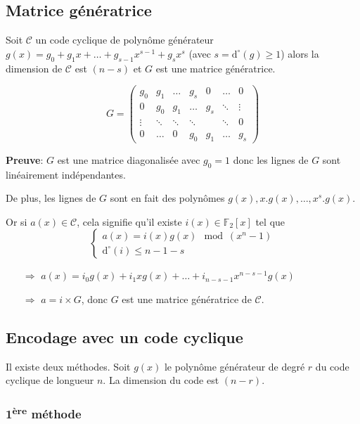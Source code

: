 \documentclass[a4paper,10pt,twocolumn]{article}
\theoremstyle{break}
\newcommand{\code}[1]{\mathcal{#1}}
\newcommand{\C}{\code{C}}
\newcommand{\F}{\mathbb{F}}
\newcommand{\FF}{\F_2}
\newcommand{\dg}[1]{\mathrm{d}^\circ(#1)}
\newenvironment{note}[1]
{\textbf{#1}:}
{}
\newenvironment{myproof}
{\begin{note}{Preuve}}
{\end{note}}
\begin{document}
\subsection{Matrice génératrice}
Soit $\C$ un code cyclique de polynôme générateur $g(x) = g_0 + g_1x + \ldots + g_{s-1}x^{s-1} + g_sx^s$ (avec $s = \dg{g} \ge 1$)
alors la dimension de $\C$ est $(n-s)$ et $G$ est une matrice génératrice.

$$ G = 
\begin{pmatrix}
 g_0 & g_1 & \ldots & g_s & 0 & \ldots & 0 \\
 0 & g_0 & g_1 & \ldots & g_s & \ddots  & \vdots \\
 \vdots & \ddots & \ddots & \ddots & & \ddots & 0 \\
 0 & \ldots & 0 & g_0 & g_1 & \ldots & g_s
\end{pmatrix}
$$

\begin{myproof}
 $G$ est une matrice diagonalisée avec $g_0=1$ donc les lignes de $G$ sont linéairement indépendantes.

 De plus, les lignes de $G$ sont en fait des polynômes $g(x), x.g(x), \ldots, x^s.g(x)$.

 Or si $a(x) \in \C$, cela signifie qu'il existe $i(x) \in \FF[x]$  tel que
 $$ \left\{ \begin{array}{l}
 a(x) = i(x)g(x) \mod (x^n-1) \\
 \dg{i} \le n-1-s
 \end{array} \right. $$
 
 \begin{itemize}
 \item[$\Rightarrow$] $a(x)=i_0 g(x) + i_1 x g(x) + \ldots + i_{n-s-1}x^{n-s-1}g(x)$
 \item[$\Rightarrow$] $a = i \times G$, donc $G$ est une matrice génératrice de $\C$.
 \end{itemize}
\end{myproof}

\subsection{Encodage avec un code cyclique}
Il existe deux méthodes. Soit $g(x)$ le polynôme générateur de degré $r$ du code cyclique de longueur $n$.
La dimension du code est $(n-r)$.

\subsubsection{1\textsuperscript{ère} méthode}
\end{document}

